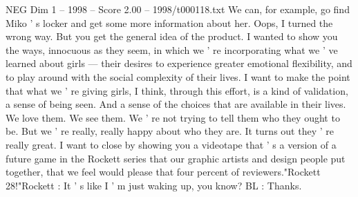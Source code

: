 \begin{textsample}{NEG Dim 1 – 1998 – Score 2.00 – 1998/t000118.txt}
We can, for example, go find Miko ' s locker and get some more information about her.
Oops, I turned the wrong way.
But you get the general idea of the product.
I wanted to show you the ways, innocuous as they seem, in which we ' re incorporating what we ' ve learned about girls — their desires to experience greater emotional flexibility, and to play around with the social complexity of their lives.
I want to make the point that what we ' re giving girls, I think, through this effort, is a kind of validation, a sense of being seen.
And a sense of the choices that are available in their lives.
We love them.
We see them.
We ' re not trying to tell them who they ought to be.
But we ' re really, really happy about who they are.
It turns out they ' re really great.
I want to close by showing you a videotape that ' s a version of a future game in the Rockett series that our graphic artists and design people put together, that we feel would please that four percent of reviewers."Rockett 28!"Rockett : It ' s like I ' m just waking up, you know?
BL : Thanks.

\end{textsample}
